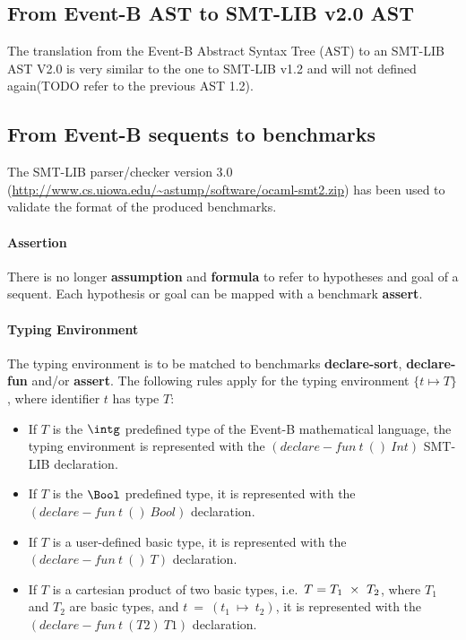 \subsection{From Event-B AST to SMT-LIB v2.0 AST}
The translation from the Event-B Abstract Syntax Tree (AST) to an SMT-LIB AST V2.0 is very similar to the one to SMT-LIB v1.2 and will not defined again(TODO refer to the previous AST 1.2).

\subsection{From Event-B sequents to benchmarks}
The SMT-LIB parser/checker version 3.0 (\url{http://www.cs.uiowa.edu/~astump/software/ocaml-smt2.zip}) has been used to validate the format of the produced benchmarks.

\paragraph{Assertion}
There is no longer \textbf{assumption} and \textbf{formula} to refer to hypotheses and goal of a sequent. Each hypothesis or goal can be mapped with a benchmark \textbf{assert}. 

\paragraph{Typing Environment}
The typing environment is to be matched to benchmarks \textbf{declare-sort},  \textbf{declare-fun} and/or \textbf{assert}. The following rules apply for the typing environment $\{t \mapsto T\}$, where identifier $t$ has type $T$:
\begin{itemize}
\item If $T$ is the $\intg$ predefined type of the Event-B 
mathematical language, the typing environment is represented 
with the $(declare-fun~t~()~Int)$  SMT-LIB declaration.
\item If $T$ is the $\Bool$ predefined type, it is
represented with the $(declare-fun~t~()~Bool)$  declaration.
\item If $T$ is a user-defined basic type, it is represented
with the $(declare-fun~t~()~T)$ declaration.
\item If $T$ is a cartesian product of two basic types, i.e.\
$T = T_1~\mathbin\times~T_2$, where $T_1$ and $T_2$ are basic types,
and $t~=~(t_1~\mapsto~t_2)$, it is represented with the 
$(declare-fun~t~(T2)~T1)$ declaration.
\end{itemize}

